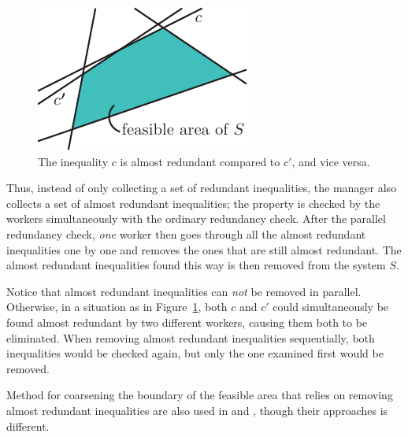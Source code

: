 \begin{figure}[htbp]
	\centering
		\includegraphics[scale=0.9]{figures/almostRedundant.pdf}
	\caption{The inequality $c$ is almost redundant compared to $c'$, and vice versa.}
	\label{fig:almostRedundant}
\end{figure}

Thus, instead of only collecting a set of redundant inequalities, the manager also collects a set of almost redundant inequalities; the property is checked by the workers simultaneously with the ordinary redundancy check. After the parallel redundancy check, \emph{one} worker then goes through all the almost redundant inequalities one by one and removes the ones that are still almost redundant. The almost redundant inequalities found this way is then removed from the system $S$.  

Notice that almost redundant inequalities can \emph{not} be removed in parallel. Otherwise, in a situation as in Figure~\ref{fig:almostRedundant}, both $c$ and $c'$ could simultaneously be found almost redundant by two different workers, causing them both to be eliminated. When removing almost redundant inequalities sequentially, both inequalities would be checked again, but only the one examined first would be removed.

Method for coarsening the boundary of the feasible area that relies on removing almost redundant inequalities are also used in \cite{lukatskii08} and \cite{shapot12}, though their approaches is different.


%
%